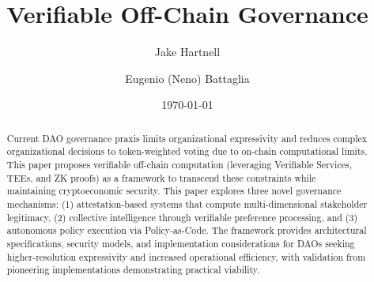 \documentclass[11pt,a4paper]{article}
\title{Verifiable Off-Chain Governance}
\author[1]{Jake Hartnell}
\author[2]{Eugenio (Neno) Battaglia}
\affil[1]{wavs.xyz}
\affil[2]{meaning.systems}
\date{\today}
\begin{document}
\maketitle

\begin{abstract}
Current DAO governance praxis limits organizational expressivity and reduces complex organizational decisions to token-weighted voting due to on-chain computational limits. This paper proposes verifiable off-chain computation (leveraging Verifiable Services, TEEs, and ZK proofs) as a framework to transcend these constraints while maintaining cryptoeconomic security. This paper explores three novel governance mechanisms: (1) attestation-based systems that compute multi-dimensional stakeholder legitimacy, (2) collective intelligence through verifiable preference processing, and (3) autonomous policy execution via Policy-as-Code. The framework provides architectural specifications, security models, and implementation considerations for DAOs seeking higher-resolution expressivity and increased operational efficiency, with validation from pioneering implementations demonstrating practical viability.
\end{abstract}



















\end{document}
